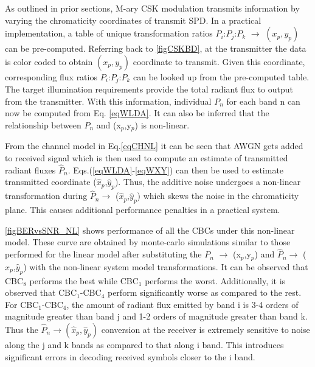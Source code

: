 \documentclass[10pt,letterpaper]{article}
\begin{document}
As outlined in prior sections, M-ary CSK modulation transmits information by varying the chromaticity coordinates of transmit SPD. In a practical implementation, a table of unique transformation ratios $P_{i}$:$P_{j}$:$P_{k}$ $\rightarrow$ $(x_{p},y_{p})$ can be pre-computed. Referring back to \figurename\ref{figCSKBD}, at the transmitter the data is color coded to obtain $(x_{p},y_{p})$ coordinate to transmit. Given this coordinate, corresponding flux ratios $P_{i}$:$P_{j}$:$P_{k}$ can be looked up from the pre-computed table. The target illumination requirements provide the total radiant flux to output from the transmitter. With this information, individual $P_{n}$ for each band n can now be computed from Eq. \eqref{eqWLDA}. It can also be inferred that the relationship between $P_{n}$ and (x$_{p}$,y$_{p}$) is non-linear.

From the channel model in Eq.\eqref{eqCHNL} it can be seen that AWGN gets added to received signal which is then used to compute an estimate of transmitted radiant fluxes $\hat{P}_{n}$. Eqs.(\ref{eqWLDA}-\ref{eqWXY}) can then be used to estimate transmitted coordinate ($\hat{x}_{p}$,$\hat{y}_{p}$). Thus, the additive noise undergoes a non-linear transformation during $\hat{P}_{n}\rightarrow$ ($\hat{x}_{p}$,$\hat{y}_{p}$) which skews the noise in the chromaticity plane. This causes additional performance penalties in a practical system.

\figurename\ref{figBERvsSNR_NL} shows performance of all the CBCs under this non-linear model. These curve are obtained by monte-carlo simulations similar to those performed for the linear model after substituting the $P_{n}$ $\rightarrow$ (x$_{p}$,y$_{p}$) and $\hat{P}_{n}\rightarrow$ ($\hat{x}_{p}$,$\hat{y}_{p}$) with the non-linear system model transformations. It can be observed that CBC$_{8}$ performs the best while CBC$_{1}$ performs the worst. Additionally, it is observed that CBC$_{1}$-CBC$_{4}$ perform significantly worse as compared to the rest. For CBC$_{1}$-CBC$_{4}$, the amount of radiant flux emitted by band i is 3-4 orders of magnitude greater than band j and 1-2 orders of magnitude greater than band k. Thus the $\hat{P}_{n}\rightarrow (\hat{x}_{p},\hat{y}_{p})$ conversion at the receiver is extremely sensitive to noise along the j and k bands as compared to that along i band. This introduces significant errors in decoding received symbols closer to the i band.
\end{document}
